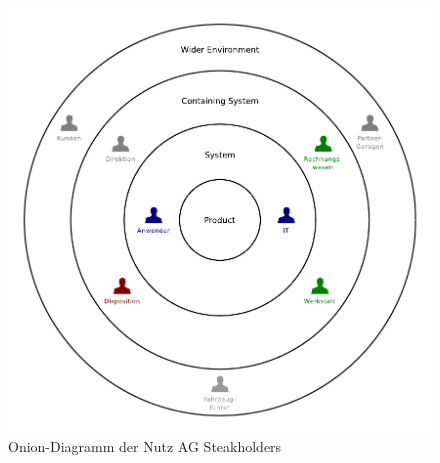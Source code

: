 \documentclass[12pt,a4paper,german]{article}
\author{Denis Augsburger, Pierro Steinger, Thomas Wilde, Nicolas Mauchle, }
\begin{document}

\newpage
\tableofcontents

\newpage
\begin{center}
  \begin{figure}[h]
    \centering
    \includegraphics{graphics/onion.pdf}
    \caption{Onion-Diagramm der Nutz AG Steakholders}
    \label{fig:awesome_image}
  \end{figure}
\end{center}
\end{document}
